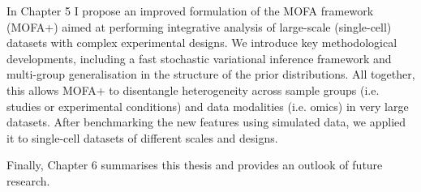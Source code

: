 In Chapter 5 I propose an improved formulation of the MOFA framework (MOFA+) aimed at performing integrative analysis of large-scale (single-cell) datasets with complex experimental designs. We introduce key methodological developments, including a fast stochastic variational inference framework and multi-group generalisation in the structure of the prior distributions. All together, this allows MOFA+ to  disentangle heterogeneity across sample groups (i.e. studies or experimental conditions) and data modalities (i.e. omics) in very large datasets. After benchmarking the new features using simulated data, we applied it to single-cell datasets of different scales and designs.

Finally, Chapter 6 summarises this thesis and provides an outlook of future research.
